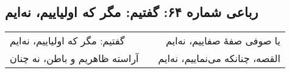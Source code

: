 \begin{center}
\section*{رباعی شماره ۶۴: گفتیم: مگر که اولیاییم، نه‌ایم}
\label{sec:064}
\begin{longtable}{l p{0.5cm} r}
گفتیم: مگر که اولیاییم، نه‌ایم
&&
یا صوفی صفهٔ صفاییم، نه‌ایم
\\
آراسته ظاهریم و باطن، نه چنان
&&
القصه، چنانکه می‌نماییم، نه‌ایم
\\
\end{longtable}
\end{center}
